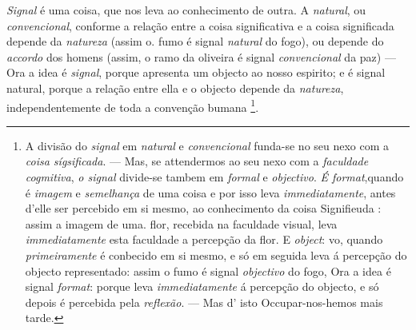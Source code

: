  
\emph{Signal} é uma coisa, que nos leva ao conhecimento de outra. A \emph{natural}, ou \emph{convencional}, conforme a relação entre a coisa significativa e a coisa significada depende da \emph{natureza} (assim o. fumo é signal \emph{natural} do fogo), ou depende do \emph{accordo} dos homens (assim, o ramo da oliveira é signal \emph{convencional} da paz) --- Ora a idea é \emph{signal}, porque apresenta um objecto ao nosso espirito; e é signal natural, porque a relação entre ella e o objecto depende da \emph{natureza}, independentemente de toda a convenção bumana \footnote{A divisão do \emph{signal} em \emph{natural} e \emph{convencional} funda-se no seu nexo com a \emph{coisa sígsificada}. --- Mas, se attendermos ao seu nexo com a \emph{faculdade cogmitiva}, \emph{o signal} divide-se tambem em \emph{formal} e \emph{objectivo}. \emph{É format},quando é \emph{imagem} e \emph{semelhança} de uma coisa e por isso leva \emph{immediatamente}, antes d'elle ser percebido em si mesmo, ao conhecimento da coisa Signifieuda : assim a imagem de uma. flor, recebida na faculdade visual, leva \emph{immediatamente} esta faculdade a percepção da flor. E \emph{object}: vo, quando \emph{primeiramente} é conbecido em si mesmo, e só em seguida leva á percepção do objecto representado: assim o fumo é signal \emph{objectivo} do fogo, Ora a idea é signal \emph{format}: porque leva \emph{immediatamente} á percepção do objecto, e só depois é percebida pela \emph{reflexão}. --- Mas d' isto Occupar-nos-hemos mais tarde.}.


